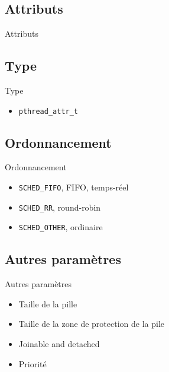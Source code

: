 \def\sectitle{Attributs}
\subsection{\sectitle}
\begin{frame}[containsverbatim]{\sectitle}
    \def\subsectitle{Type}
    \subsection{\subsectitle}
    \begin{block}{\subsectitle}
        \begin{itemize}
            \item \verb+pthread_attr_t+
        \end{itemize}
    \end{block}
    \def\subsectitle{Ordonnancement}
    \subsection{\subsectitle}
    \begin{block}{\subsectitle}
        \begin{itemize}
            \item \verb+SCHED_FIFO+, FIFO, temps-réel
            \item \verb+SCHED_RR+, round-robin
            \item \verb+SCHED_OTHER+, ordinaire
        \end{itemize}
    \end{block}
    \def\subsectitle{Autres paramètres}
    \subsection{\subsectitle}
    \begin{block}{\subsectitle}
        \begin{itemize}
            \item Taille de la pille
            \item Taille de la zone de protection de la pile
            \item Joinable and detached
            \item Priorité
        \end{itemize}
    \end{block}
\end{frame}

\def\sectitle{Attention}

